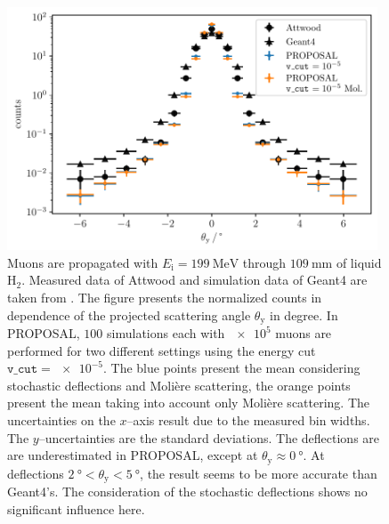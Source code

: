 \documentclass[pdflatex, sn-mathphys]{sn-jnl}%
\theoremstyle{thmstyleone}%
\theoremstyle{thmstyletwo}%
\theoremstyle{thmstylethree}%
\begin{document}
\begin{figure}
    \centering 
    \includegraphics[width=0.98\textwidth]{../../deflection/plots/FINAL/attwood_comparison_moliere_199MeV_final_multi_mean_deg.pdf}
    \caption{
    Muons are 
    propagated with $E_{\mathrm{i}} = \SI{199}{\mega\electronvolt}$ through 
    $\SI{109}{\milli\meter}$ of liquid $\text{H}_2$.
    Measured data of Attwood and simulation data of Geant4 are taken from \cite{attwood_2006}.    
    The figure presents 
    the normalized counts in dependence of the projected scattering angle $\theta_{\mathrm{y}}$ in degree.
    In PROPOSAL, $100$ simulations each with $\num{e5}$ muons are performed for two different settings using the energy cut 
    $\texttt{v\_cut} = \num{e-5}$. The blue points present the mean considering stochastic deflections and Molière scattering, the orange points
    present the mean taking into account only Molière scattering.   
    The uncertainties on the $x$--axis result due to the measured bin widths. The $y$--uncertainties are the standard deviations.   
    The deflections are  
    are underestimated in PROPOSAL, except at $\theta_{\mathrm{y}} \approx \SI{0}{\degree}$. At deflections $\SI{2}{\degree} < \theta_{\mathrm{y}} < \SI{5}{\degree}$, 
    the result seems to be more accurate than Geant4's. The consideration of the stochastic deflections shows no significant influence here.}
    \label{fig:attwood_comparison}
\end{figure}
\end{document}

